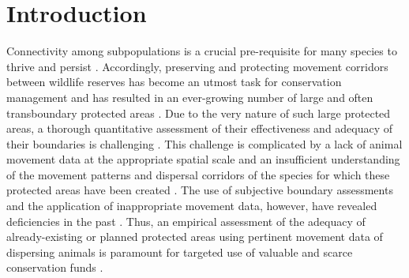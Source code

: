 \documentclass[abstract=on,10pt,a4paper,bibliography=totocnumbered]{article}
\begin{document}
\newpage


\linenumbers

\section{Introduction}
Connectivity among subpopulations is a crucial pre-requisite for many species to
thrive and persist \citep{Fahrig.2003}. Accordingly, preserving and protecting
movement corridors between wildlife reserves has become an utmost task for
conservation management \citep{Heller.2009, Doerr.2011, Rudnick.2012,
Cozzi.2020} and has resulted in an ever-growing number of large and often
transboundary protected areas \citep{Wolmer.2003}. Due to the very nature of
such large protected areas, a thorough quantitative assessment of their
effectiveness and adequacy of their boundaries is challenging
\citep{Rudnick.2012}. This challenge is complicated by a lack of animal movement
data at the appropriate spatial scale and an insufficient understanding of the
movement patterns and dispersal corridors of the species for which these
protected areas have been created \citep{Vasudev.2015, Tshipa.2017, Cozzi.2020}.
The use of subjective boundary assessments and the application of inappropriate
movement data, however, have revealed deficiencies in the past
\citep{Clevenger.2002, Pullinger.2010, Sawyer.2011, Elliot.2014, Abrahms.2016}.
Thus, an empirical assessment of the adequacy of already-existing or planned
protected areas using pertinent movement data of dispersing animals is paramount
for targeted use of valuable and scarce conservation funds
\citep{Pullinger.2010, Sawyer.2011}.
\end{document}
